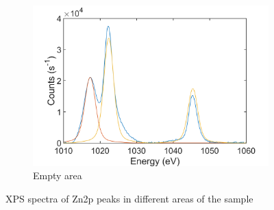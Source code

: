 \begin{figure}[!h]
\begin{center}
		\begin{subfigure}[b]{0.4\textwidth}
			\includegraphics[width=\textwidth]{WSe2/WSe2XPSRefZn.png}
			\caption{Empty area}
			\label{fig:WSe2XPSRefZn}
		\end{subfigure}
		\caption{XPS spectra of Zn2p peaks in different areas of the sample}
		\label{fig:WSe2XPSZn}
	\end{center}
\end{figure}

